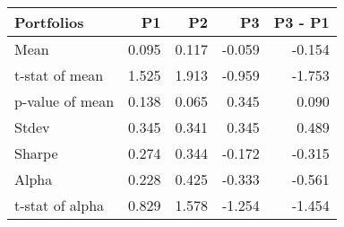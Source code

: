 \begin{tabular}{lrrrr}
\toprule
Portfolios & P1 & P2 & P3 & P3 - P1 \\
\midrule
Mean & 0.095 & 0.117 & -0.059 & -0.154 \\
t-stat of mean & 1.525 & 1.913 & -0.959 & -1.753 \\
p-value of mean & 0.138 & 0.065 & 0.345 & 0.090 \\
Stdev & 0.345 & 0.341 & 0.345 & 0.489 \\
Sharpe & 0.274 & 0.344 & -0.172 & -0.315 \\
Alpha & 0.228 & 0.425 & -0.333 & -0.561 \\
t-stat of alpha & 0.829 & 1.578 & -1.254 & -1.454 \\
\bottomrule
\end{tabular}
